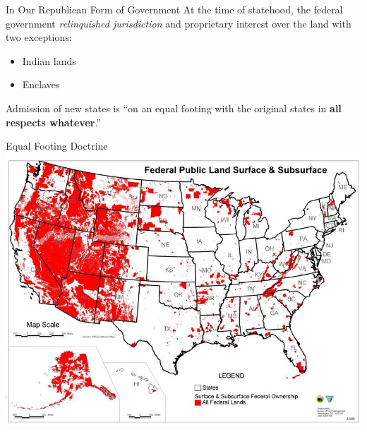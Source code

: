 \begin{frame}
    \begin{block}{In Our Republican Form of Government}
        At the time of statehood, the federal government \emph{relinquished jurisdiction} and proprietary interest over the land with two exceptions:
        \begin{itemize}
            \item Indian lands
            \item Enclaves
        \end{itemize}
        Admission of new states is ``on an equal footing with the original states in \textbf{all respects whatever}.'' \\
    \end{block}
\end{frame}

\begin{frame}{Equal Footing Doctrine}
    \centering
    \includegraphics[height=0.95\textheight]{img/federal-lands.png} \\
\end{frame}


